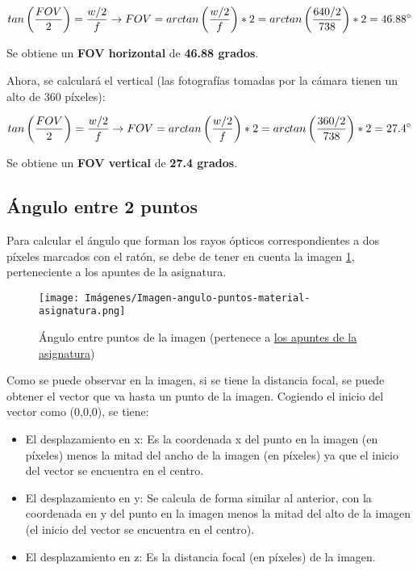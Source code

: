 \documentclass[12pt]{article}
\begin{document}
$$tan\left(\frac{FOV}{2}\right) = \frac{w/2}{f} \rightarrow FOV = arctan\left(\frac{w/2}{f}\right)*2 = arctan\left(\frac{640/2}{738}\right)*2 = 46.88\degree$$

Se obtiene un \textbf{FOV horizontal} de \textbf{46.88 grados}.

Ahora, se calculará el vertical (las fotografías tomadas por la cámara tienen un alto de 360 píxeles):

$$tan\left(\frac{FOV}{2}\right) = \frac{w/2}{f} \rightarrow FOV = arctan\left(\frac{w/2}{f}\right)*2 = arctan\left(\frac{360/2}{738}\right)*2 = 27.4\degree$$

Se obtiene un \textbf{FOV vertical} de \textbf{27.4 grados}.

\subsection*{Ángulo entre 2 puntos}

Para calcular el ángulo que forman los rayos ópticos correspondientes  a dos píxeles marcados con el ratón, se debe de tener en cuenta la imagen \ref{fig:angulo-entre-puntos}, perteneciente a los apuntes de la asignatura.


\begin{figure} [h]
    \centering
    \texttt{[image: Imágenes/Imagen-angulo-puntos-material-asignatura.png]}
    \caption{Ángulo entre puntos de la imagen (pertenece a \href{https://raw.githubusercontent.com/albertoruiz/umucv/master/images/demos/anglepixs.svg}{los apuntes de la asignatura})}
    \label{fig:angulo-entre-puntos}
\end{figure}
Como se puede observar en la imagen, si se tiene la distancia focal, se puede obtener el vector que va hasta un punto de la imagen. Cogiendo el inicio del vector como (0,0,0), se tiene:

\begin{itemize}
    \item El desplazamiento en x: Es la coordenada x del punto en la imagen (en píxeles) menos la mitad del ancho de la imagen (en píxeles) ya que el inicio del vector se encuentra en el centro. 
    \item El desplazamiento en y: Se calcula de forma similar al anterior, con la coordenada en y del punto en la imagen menos la mitad del alto de la imagen (el inicio del vector se encuentra en el centro).
    \item El desplazamiento en z: Es la distancia focal (en píxeles) de la imagen. 
\end{itemize}
\end{document}
